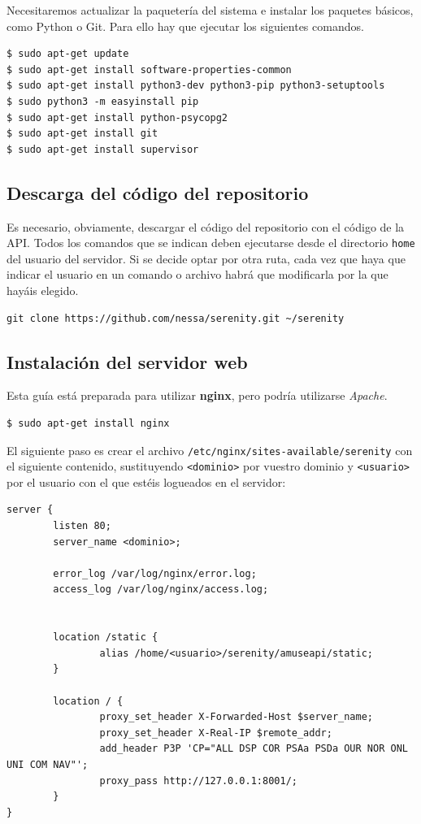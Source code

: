 Necesitaremos actualizar la paquetería del sistema e instalar los paquetes
básicos, como Python o Git. Para ello hay que ejecutar los siguientes comandos.

\begin{verbatim}
$ sudo apt-get update
$ sudo apt-get install software-properties-common
$ sudo apt-get install python3-dev python3-pip python3-setuptools
$ sudo python3 -m easyinstall pip
$ sudo apt-get install python-psycopg2
$ sudo apt-get install git
$ sudo apt-get install supervisor
\end{verbatim}

\subsection{Descarga del código del repositorio}

Es necesario, obviamente, descargar el código del repositorio con el código
de la API.\cite{repo-serenity} Todos los comandos que se indican deben
ejecutarse desde el directorio \texttt{home} del usuario del servidor. Si se
decide optar por otra ruta, cada vez que haya que indicar el usuario en un
comando o archivo habrá que modificarla por la que hayáis elegido.

\begin{verbatim}
git clone https://github.com/nessa/serenity.git ~/serenity
\end{verbatim}


\subsection{Instalación del servidor web}

Esta guía está preparada para utilizar \textbf{nginx}, pero podría utilizarse
\textit{Apache}.

\begin{verbatim}
$ sudo apt-get install nginx
\end{verbatim}

El siguiente paso es crear el archivo \texttt{/etc/nginx/sites-available/serenity}
con el siguiente contenido, sustituyendo \texttt{<dominio>} por vuestro dominio y
\texttt{<usuario>} por el usuario con el que estéis logueados en el servidor:

\begin{verbatim}
server {
        listen 80;
        server_name <dominio>;

        error_log /var/log/nginx/error.log;
        access_log /var/log/nginx/access.log;


        location /static {
                alias /home/<usuario>/serenity/amuseapi/static;
        }

        location / {
                proxy_set_header X-Forwarded-Host $server_name;
                proxy_set_header X-Real-IP $remote_addr;
                add_header P3P 'CP="ALL DSP COR PSAa PSDa OUR NOR ONL UNI COM NAV"';
                proxy_pass http://127.0.0.1:8001/;
        }
}
\end{verbatim}

